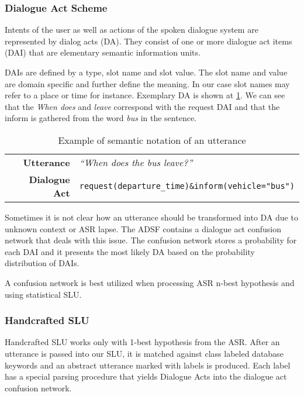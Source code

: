 \subsubsection{Dialogue Act Scheme}

Intents of the user as well as actions of the spoken dialogue system are represented by dialog acts (DA).
They consist of one or more dialogue act items (DAI) that are elementary semantic information units.

DAIs are defined by a type, slot name and slot value.
The slot name and value are domain specific and further define the meaning.
In our case slot names may refer to a place or time for instance.
Exemplary DA is shown at \ref{table:utterance}. We can see that the \textit{When does} and \textit{leave} correspond with the request DAI and that the inform is gathered from the word \textit{bus} in the sentence.

\begin{table}[h]
\centering
\begin{tabular}{ r | l }
	\textbf{Utterance} & \textit{``When does the bus leave?''} \\
	\textbf{Dialogue Act} & \texttt{request(departure\_time)\&inform(vehicle="bus")}
\end{tabular}
\caption[Semantic notation of an utterance]{Example of semantic notation of an utterance}
\label{table:utterance}
\end{table}

Sometimes it is not clear how an utterance should be transformed into DA due to unknown context or ASR lapse.
The ADSF contains a dialogue act confusion network that deals with this issue. %
The confusion network stores a probability for each DAI and it presents the most likely DA based on the probability distribution of DAIs.

A confusion network is best utilized when processing ASR n-best hypothesis and using statistical SLU.

\subsubsection{Handcrafted SLU}

Handcrafted SLU works only with 1-best hypothesis from the ASR.
After an utterance is passed into our SLU, it is matched against class labeled database keywords and an abstract utterance marked with labels is produced.
Each label has a special parsing procedure that yields Dialogue Acts into the dialogue act confusion network.

